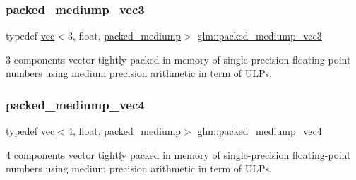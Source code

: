 \subsubsection{\texorpdfstring{packed\+\_\+mediump\+\_\+vec3}{packed\_mediump\_vec3}}
{\footnotesize\ttfamily typedef \mbox{\hyperlink{structglm_1_1vec}{vec}}$<$3, float, \mbox{\hyperlink{namespaceglm_a36ed105b07c7746804d7fdc7cc90ff25a9604654c3b137cd7898689fd34b25bc0}{packed\+\_\+mediump}}$>$ \mbox{\hyperlink{group__gtc__type__aligned_ga34ad82503f637918457284618bef3a82}{glm\+::packed\+\_\+mediump\+\_\+vec3}}}



3 components vector tightly packed in memory of single-\/precision floating-\/point numbers using medium precision arithmetic in term of U\+L\+Ps. 

\mbox{\label{group__gtc__type__aligned_ga18f1166b7888d6e0d7d659f5a022e6ea}} 
\subsubsection{\texorpdfstring{packed\+\_\+mediump\+\_\+vec4}{packed\_mediump\_vec4}}
{\footnotesize\ttfamily typedef \mbox{\hyperlink{structglm_1_1vec}{vec}}$<$4, float, \mbox{\hyperlink{namespaceglm_a36ed105b07c7746804d7fdc7cc90ff25a9604654c3b137cd7898689fd34b25bc0}{packed\+\_\+mediump}}$>$ \mbox{\hyperlink{group__gtc__type__aligned_ga18f1166b7888d6e0d7d659f5a022e6ea}{glm\+::packed\+\_\+mediump\+\_\+vec4}}}



4 components vector tightly packed in memory of single-\/precision floating-\/point numbers using medium precision arithmetic in term of U\+L\+Ps. 

\mbox{\label{group__gtc__type__aligned_gab4eb372e84e817a0d29128128394df01}} 

